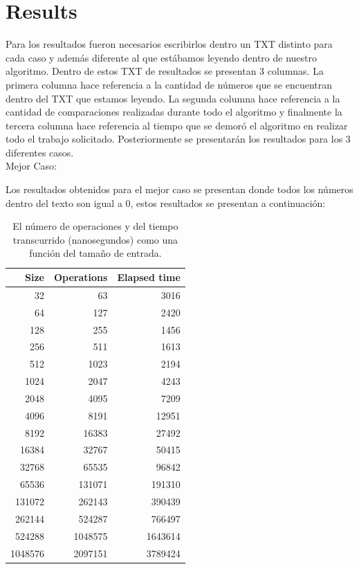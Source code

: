 \section{Results}
Para los resultados fueron necesarios escribirlos dentro un TXT distinto para cada caso y además diferente al que estábamos leyendo dentro de nuestro algoritmo. Dentro de estos TXT de resultados se presentan 3 columnas. La primera columna hace referencia a la cantidad de números que se encuentran dentro del TXT que estamos leyendo. La segunda columna hace referencia a la cantidad de comparaciones realizadas durante todo el algoritmo y finalmente la tercera columna hace referencia al tiempo que se demoró el algoritmo en realizar todo el trabajo solicitado. Posteriormente se presentarán los resultados para los 3 diferentes casos. \\

Mejor Caso:  

Los resultados obtenidos para el mejor caso se presentan donde todos los números dentro del texto son igual a 0, estos resultados se presentan a continuación: 


\begin{table}[H]	%
	\centering	%
	\caption{
		El número de operaciones y del tiempo transcurrido (nanosegundos) como una función del tamaño de entrada.
	}	%

	\begin{tabular}{r r r}
		Size & Operations & Elapsed time \\
		\hline
		32 & 63 &  3016 \\
		64 & 127 &  2420 \\
		128& 255 &  1456 \\
		256& 511 & 1613 \\
		512& 1023&  2194 \\
	    1024 & 2047 & 4243 \\
	    2048 & 4095 & 7209 \\
	    4096 & 8191 & 12951 \\
	    8192 & 16383 & 27492 \\
	    16384 & 32767 & 50415 \\
	    32768 & 65535 & 96842 \\
	    65536 & 131071 & 191310 \\
	    131072 & 262143 & 390439 \\
	    262144 & 524287 & 766497 \\
	    524288 & 1048575 & 1643614 \\
	    1048576 & 2097151 & 3789424 \\
	        
	\end{tabular}

\end{table}


